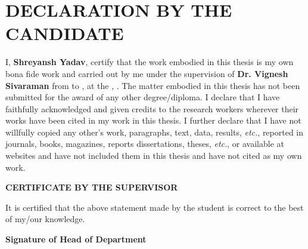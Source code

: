 \chapter*{\centering\normalsize DECLARATION BY THE CANDIDATE}

I, \textbf{Shreyansh Yadav}, certify that the work embodied in this thesis is my own bona fide work and carried out by me under the supervision of \textbf{Dr. Vignesh Sivaraman} from \textbf{\projectstart{}} to \textbf{\projectend{}}, at the \textbf{\department{}}, \institute{}. The matter embodied in this thesis has not been submitted for the award of any other degree/diploma. I declare that I have faithfully acknowledged and given credits to the research workers wherever their works have been cited in my work in this thesis. I further declare that I have not willfully copied any other's work, paragraphs, text, data, results, \textit{etc.}, reported in journals, books, magazines, reports dissertations, theses, \textit{etc.}, or available at websites and have not included them in this thesis and have not cited as my own work.



\vspace{0.5cm}

\textbf{\centering CERTIFICATE BY THE SUPERVISOR\\}

\vspace{1cm}

It is certified that the above statement made by the student is correct to the best of my/our
knowledge.



\vfill

{\centering\textbf{Signature of Head of Department
\\}}
